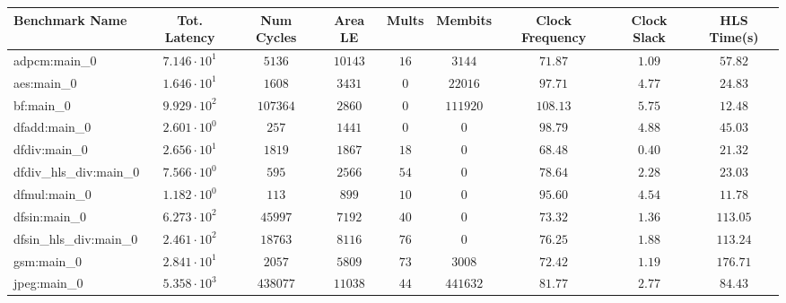 \begin{tabular}{|l|c|c|c|c|c|c|c|c|}
\hline
Benchmark Name          & Tot. Latency           & Num Cycles & Area LE   & Mults   & Membits    & Clock Frequency & Clock Slack & HLS Time(s) \\
\hline
adpcm:main\_0           & $ 7.146 \cdot 10^{1} $ & $ 5136   $ & $ 10143 $ & $ 16  $ & $ 3144   $ & $ 71.87       $ & $ 1.09    $ & $ 57.82   $ \\
aes:main\_0             & $ 1.646 \cdot 10^{1} $ & $ 1608   $ & $ 3431  $ & $ 0   $ & $ 22016  $ & $ 97.71       $ & $ 4.77    $ & $ 24.83   $ \\
bf:main\_0              & $ 9.929 \cdot 10^{2} $ & $ 107364 $ & $ 2860  $ & $ 0   $ & $ 111920 $ & $ 108.13      $ & $ 5.75    $ & $ 12.48   $ \\
dfadd:main\_0           & $ 2.601 \cdot 10^{0} $ & $ 257    $ & $ 1441  $ & $ 0   $ & $ 0      $ & $ 98.79       $ & $ 4.88    $ & $ 45.03   $ \\
dfdiv:main\_0           & $ 2.656 \cdot 10^{1} $ & $ 1819   $ & $ 1867  $ & $ 18  $ & $ 0      $ & $ 68.48       $ & $ 0.40    $ & $ 21.32   $ \\
dfdiv\_hls\_div:main\_0 & $ 7.566 \cdot 10^{0} $ & $ 595    $ & $ 2566  $ & $ 54  $ & $ 0      $ & $ 78.64       $ & $ 2.28    $ & $ 23.03   $ \\
dfmul:main\_0           & $ 1.182 \cdot 10^{0} $ & $ 113    $ & $ 899   $ & $ 10  $ & $ 0      $ & $ 95.60       $ & $ 4.54    $ & $ 11.78   $ \\
dfsin:main\_0           & $ 6.273 \cdot 10^{2} $ & $ 45997  $ & $ 7192  $ & $ 40  $ & $ 0      $ & $ 73.32       $ & $ 1.36    $ & $ 113.05  $ \\
dfsin\_hls\_div:main\_0 & $ 2.461 \cdot 10^{2} $ & $ 18763  $ & $ 8116  $ & $ 76  $ & $ 0      $ & $ 76.25       $ & $ 1.88    $ & $ 113.24  $ \\
gsm:main\_0             & $ 2.841 \cdot 10^{1} $ & $ 2057   $ & $ 5809  $ & $ 73  $ & $ 3008   $ & $ 72.42       $ & $ 1.19    $ & $ 176.71  $ \\
jpeg:main\_0            & $ 5.358 \cdot 10^{3} $ & $ 438077 $ & $ 11038 $ & $ 44  $ & $ 441632 $ & $ 81.77       $ & $ 2.77    $ & $ 84.43   $ \\

\end{tabular}
